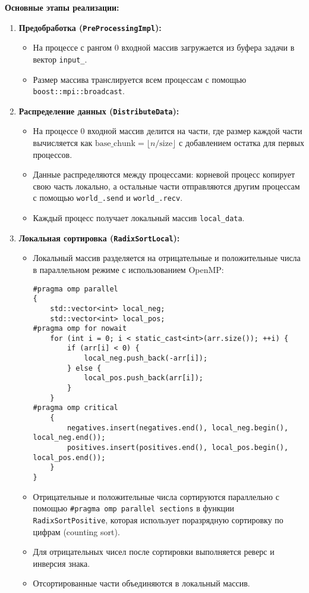 \documentclass[12pt]{article}
\begin{document}
\textbf{Основные этапы реализации:}
\begin{enumerate}
  \item \textbf{Предобработка (\texttt{PreProcessingImpl}):}
  \begin{itemize}
    \item На процессе с рангом 0 входной массив загружается из буфера задачи в вектор \texttt{input\_}.
    \item Размер массива транслируется всем процессам с помощью \texttt{boost::mpi::broadcast}.
  \end{itemize}

  \item \textbf{Распределение данных (\texttt{DistributeData}):}
  \begin{itemize}
    \item На процессе 0 входной массив делится на части, где размер каждой части вычисляется как $\text{base\_chunk} = \lfloor n / \text{size} \rfloor$ с добавлением остатка для первых процессов.
    \item Данные распределяются между процессами: корневой процесс копирует свою часть локально, а остальные части отправляются другим процессам с помощью \texttt{world\_.send} и \texttt{world\_.recv}.
    \item Каждый процесс получает локальный массив \texttt{local\_data}.
  \end{itemize}

  \item \textbf{Локальная сортировка (\texttt{RadixSortLocal}):}
  \begin{itemize}
    \item Локальный массив разделяется на отрицательные и положительные числа в параллельном режиме с использованием OpenMP:
    \begin{lstlisting}
#pragma omp parallel
{
    std::vector<int> local_neg;
    std::vector<int> local_pos;
#pragma omp for nowait
    for (int i = 0; i < static_cast<int>(arr.size()); ++i) {
        if (arr[i] < 0) {
            local_neg.push_back(-arr[i]);
        } else {
            local_pos.push_back(arr[i]);
        }
    }
#pragma omp critical
    {
        negatives.insert(negatives.end(), local_neg.begin(), local_neg.end());
        positives.insert(positives.end(), local_pos.begin(), local_pos.end());
    }
}
    \end{lstlisting}
    \item Отрицательные и положительные числа сортируются параллельно с помощью \texttt{\#pragma omp parallel sections} в функции \texttt{RadixSortPositive}, которая использует поразрядную сортировку по цифрам (counting sort).
    \item Для отрицательных чисел после сортировки выполняется реверс и инверсия знака.
    \item Отсортированные части объединяются в локальный массив.
  \end{itemize}


\end{enumerate}
\end{document}
